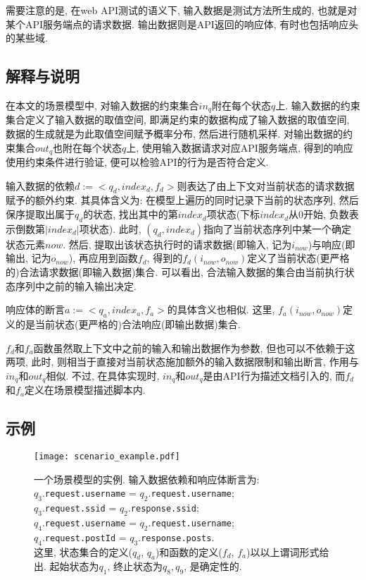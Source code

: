             需要注意的是, 在web API测试的语义下, 输入数据是测试方法所生成的, 也就是对某个API服务端点的请求数据. 输出数据则是API返回的响应体, 有时也包括响应头的某些域.
        
        \subsection{解释与说明}
            在本文的场景模型中, 对输入数据的约束集合$in_q$附在每个状态$q$上. 输入数据的约束集合定义了输入数据的取值空间, 即满足约束的数据构成了输入数据的取值空间, 数据的生成就是为此取值空间赋予概率分布, 然后进行随机采样. 对输出数据的约束集合$out_q$也附在每个状态$q$上, 使用输入数据请求对应API服务端点, 得到的响应使用约束条件进行验证, 便可以检验API的行为是否符合定义.
            
            输入数据的依赖$d := <q_d, index_d, f_d >$则表达了由上下文对当前状态的请求数据赋予的额外约束. 其具体含义为: 在模型上遍历的同时记录下当前的状态序列, 然后保序提取出属于$q_d$的状态, 找出其中的第$index_d$项状态(下标$index_d$从0开始, 负数表示倒数第$|index_d|$项状态). 此时, $(q_d, index_d)$指向了当前状态序列中某一个确定状态元素$now$. 然后, 提取出该状态执行时的请求数据(即输入, 记为$i_{now}$)与响应(即输出, 记为$o_{now}$), 再应用到函数$f_d$, 得到的$f_d(i_{now}, o_{now})$定义了当前状态(更严格的)合法请求数据(即输入数据)集合. 可以看出, 合法输入数据的集合由当前执行状态序列中之前的输入输出决定.
            
            响应体的断言$a := <q_a, index_a, f_a>$的具体含义也相似. 这里, $f_a(i_{now}, o_{now})$定义的是当前状态(更严格的)合法响应(即输出数据)集合.
            
            $f_d$和$f_a$函数虽然取上下文中之前的输入和输出数据作为参数, 但也可以不依赖于这两项, 此时, 则相当于直接对当前状态施加额外的输入数据限制和输出断言, 作用与$in_q$和$out_q$相似. 不过, 在具体实现时, $in_q$和$out_q$是由API行为描述文档引入的, 而$f_d$和$f_a$定义在场景模型描述脚本内.
        
        \subsection{示例}
            \begin{figure}[!htb]
                \centering
                \texttt{[image: scenario\_example.pdf]}
                \caption{一个场景模型的实例. 输入数据依赖和响应体断言为: \\
                $q_3$.\texttt{request.username} = $q_2$.\texttt{request.username};\\
                $q_3$.\texttt{request.ssid} = $q_2$.\texttt{response.ssid};\\
                $q_4$.\texttt{request.username} = $q_2$.\texttt{request.username};\\
                $q_4$.\texttt{request.postId} = $q_3$.\texttt{response.posts}.\\
                这里, 状态集合的定义($q_d$, $q_a$)和函数的定义($f_d$, $f_a$)以以上谓词形式给出. 起始状态为$q_1$, 终止状态为$q_8, q_9$, 是确定性的.}
                \label{fig:scenario_example}
            \end{figure}
            
